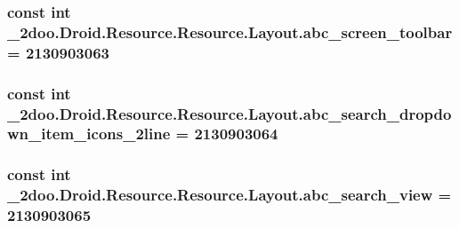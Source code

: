 \hypertarget{class__2doo_1_1_droid_1_1_resource_1_1_layout_a60310cd406c81765fa9600af1da05e1}{
\subsubsection[{abc\_\-screen\_\-toolbar}]{\setlength{\rightskip}{0pt plus 5cm}const int \_\-2doo.Droid.Resource.Resource.Layout.abc\_\-screen\_\-toolbar = 2130903063}}
\label{class__2doo_1_1_droid_1_1_resource_1_1_layout_a60310cd406c81765fa9600af1da05e1}


\hypertarget{class__2doo_1_1_droid_1_1_resource_1_1_layout_a376e47f1ddadf3ceeb98af724ab7b6d}{
\subsubsection[{abc\_\-search\_\-dropdown\_\-item\_\-icons\_\-2line}]{\setlength{\rightskip}{0pt plus 5cm}const int \_\-2doo.Droid.Resource.Resource.Layout.abc\_\-search\_\-dropdown\_\-item\_\-icons\_\-2line = 2130903064}}
\label{class__2doo_1_1_droid_1_1_resource_1_1_layout_a376e47f1ddadf3ceeb98af724ab7b6d}


\hypertarget{class__2doo_1_1_droid_1_1_resource_1_1_layout_97369b0b812361fdc89b48776a370a0a}{
\subsubsection[{abc\_\-search\_\-view}]{\setlength{\rightskip}{0pt plus 5cm}const int \_\-2doo.Droid.Resource.Resource.Layout.abc\_\-search\_\-view = 2130903065}}
\label{class__2doo_1_1_droid_1_1_resource_1_1_layout_97369b0b812361fdc89b48776a370a0a}


